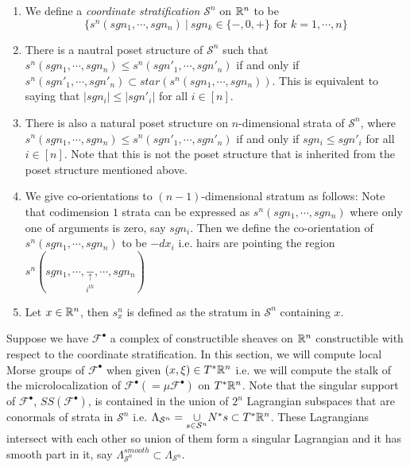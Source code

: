 \begin{definition}\label{coordinate}
\begin{enumerate}
\item We define a \emph{coordinate stratification} $\mathcal{S}^n$ on $\mathbb{R}^n$ to be 
\[
\{s^n(sgn_1,\cdots, sgn_n) ~|~ sgn_k \in \{-,0,+\}\text{ for }k=1,\cdots,n\}
\]

\item There is a nautral poset structure of $\mathcal{S}^n$ such that $s^n(sgn_1,\cdots, sgn_n)\leq s^n(sgn'_1,\cdots, sgn'_n)$ if and only if $s^n(sgn'_1,\cdots, sgn'_n) \subset star(s^n(sgn_1,\cdots, sgn_n))$. This is equivalent to saying that $|sgn_i| \leq |sgn'_i|$ for all $i\in [n]$.

\item There is also a natural poset structure on $n$-dimensional strata of $\mathcal{S}^n$, where $s^n(sgn_1,\cdots, sgn_n)\leq s^n(sgn'_1,\cdots, sgn'_n)$ if and only if $sgn_i \leq sgn'_i$ for all $i\in [n]$. Note that this is not the poset structure that is inherited from the poset structure mentioned above.

\item We give co-orientations to $(n-1)$-dimensional stratum as follows: Note that codimension $1$ strata can be expressed as $s^n(sgn_1,\cdots,sgn_n)$ where only one of arguments is zero, say $sgn_i$. Then we define the co-orientation of $s^n(sgn_1,\cdots,sgn_n)$ to be $-dx_i$ i.e. hairs are pointing the region $s^n(sgn_1,\cdots,\underset{i^{th}}{\underset{\uparrow}{-}},\cdots,sgn_n)$

\item Let $x\in \mathbb{R}^n$, then $s^n_x$ is defined as the stratum in $\mathcal{S}^n$ containing $x$.
\end{enumerate}
\end{definition}
Suppose we have 
$\mathscr{F}^\bullet$ a complex of constructible sheaves on $\mathbb{R}^n$ constructible with respect to the coordinate stratification. In this section, we will compute local Morse groups of $\mathscr{F}^\bullet$ when given $(x,\xi)\in T^*\mathbb{R}^n$ i.e. we will compute the stalk of the microlocalization of $\mathscr{F}^\bullet(=\mu \mathscr{F}^\bullet)$ on $T^*\mathbb{R}^n$.
Note that the singular support of $\mathscr{F}^\bullet$, $SS(\mathscr{F}^\bullet)$, is contained in the union of $2^n$ Lagrangian subspaces that are conormals of strata in $\mathcal{S}^n$ i.e. $\Lambda_{\mathcal{S}^n} = \underset{s\in \mathcal{S}^n}{\cup} N^*s \subset T^*\mathbb{R}^n$. These Lagrangians intersect with each other so union of them form a singular Lagrangian and it has smooth part in it, say $\Lambda_{\mathcal{S}^n}^{smooth}\subset \Lambda_{\mathcal{S}^n}$.
